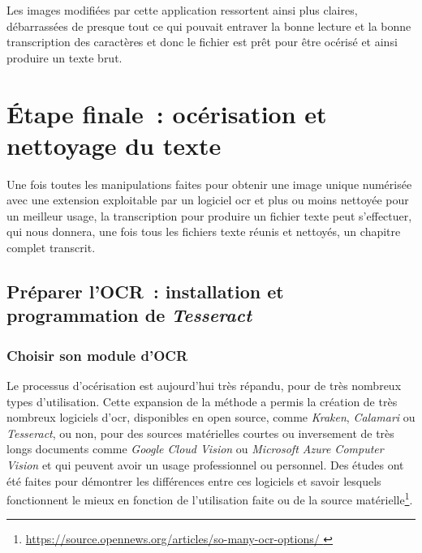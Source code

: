 Les images modifiées par cette application ressortent ainsi plus claires, débarrassées de presque tout ce qui pouvait entraver la bonne lecture et la bonne transcription des caractères et donc le fichier est prêt pour être océrisé et ainsi produire un texte brut.

\section{Étape finale~: océrisation et nettoyage du texte}
Une fois toutes les manipulations faites pour obtenir une image unique numérisée avec une extension exploitable par un logiciel \acrshort{ocr} et plus ou moins nettoyée pour un meilleur usage, la transcription pour produire un fichier texte peut s'effectuer, qui nous donnera, une fois tous les fichiers texte réunis et nettoyés, un chapitre complet transcrit.

\subsection{Préparer l'OCR~: installation et programmation de \emph{Tesseract}}
\subsubsection{Choisir son module d'OCR}
Le processus d'océrisation est aujourd'hui très répandu, pour de très nombreux types d'utilisation. Cette expansion de la méthode a permis la création de très nombreux logiciels d'\acrshort{ocr}, disponibles en open source, comme \emph{Kraken}, \emph{Calamari} ou \emph{Tesseract}, ou non, pour des sources matérielles courtes ou inversement de très longs documents comme \emph{Google Cloud Vision} ou \emph{Microsoft Azure Computer Vision} et qui peuvent avoir un usage professionnel ou personnel. Des études ont été faites pour démontrer les différences entre ces logiciels et savoir lesquels fonctionnent le mieux en fonction de l'utilisation faite ou de la source matérielle{\footnote{\url{https://source.opennews.org/articles/so-many-ocr-options/ }}}.

